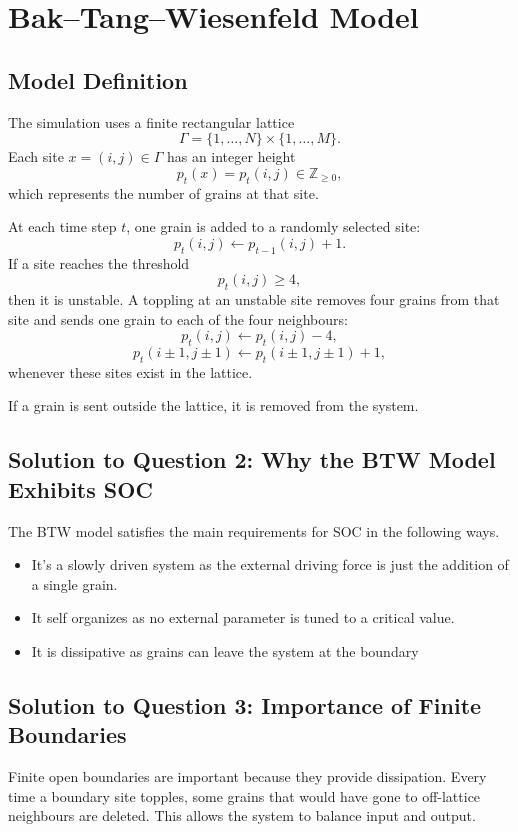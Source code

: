 \documentclass[11pt]{article}
\newcommand{\Z}{\mathbb{Z}}
\begin{document}
\section{Bak--Tang--Wiesenfeld Model}

\subsection{Model Definition}

The simulation uses a finite rectangular lattice
\[
    \Gamma = \{1,\ldots,N\}\times \{1,\ldots,M\}.
\]
Each site \(x=(i,j)\in \Gamma\) has an integer height
\[
    p_t(x) = p_t(i,j) \in \Z_{\geq 0},
\]
which represents the number of grains at that site.

At each time step \(t\), one grain is added to a randomly selected site:
\[
    p_t(i,j) \leftarrow p_{t-1}(i,j)+1.
\]
If a site reaches the threshold
\[
    p_t(i,j) \geq 4,
\]
then it is unstable. 
A toppling at an unstable site removes four grains from that site and sends one grain to each of the four neighbours:
\[
    p_t(i,j) \leftarrow p_t(i,j)-4,
\]
\[
    p_t(i\pm1,j\pm1) \leftarrow p_t(i\pm1,j\pm1)+1,
\]
whenever these sites exist in the lattice.

If a grain is sent outside the lattice, it is removed from the system. 

\subsection{Solution to Question 2: Why the BTW Model Exhibits SOC}
The BTW model satisfies the main requirements for SOC in the following ways.

\begin{itemize}
    \item It's a slowly driven system as the external driving force is just the addition of a single grain.
    \item It self organizes as no external parameter is tuned to a critical value.
    \item It is dissipative as grains can leave the system at the boundary
\end{itemize}


\subsection{Solution to Question 3: Importance of Finite Boundaries}

Finite open boundaries are important because they provide dissipation. 
Every time a boundary site topples, some grains that would have gone to off-lattice neighbours are deleted.  This allows the system to balance input and output.
\end{document}
